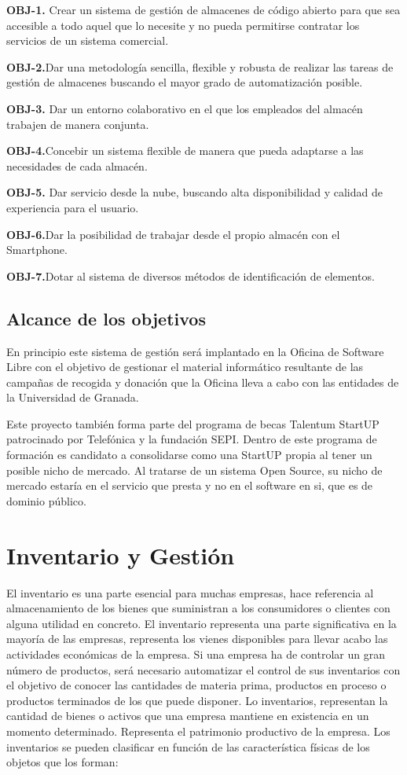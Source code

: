 \documentclass[a4paper,11pt]{book}
\begin{document}
\textbf{OBJ-1.} Crear un sistema de gestión de almacenes de código abierto para que sea accesible  a todo aquel que lo necesite y no pueda permitirse contratar los servicios de un sistema comercial. 

\textbf{OBJ-2.}Dar una metodología sencilla, flexible y robusta de realizar las tareas de gestión de almacenes buscando el mayor grado de automatización posible. 

\textbf{OBJ-3.} Dar un entorno colaborativo en el que los empleados del almacén trabajen de manera conjunta.

\textbf{OBJ-4.}Concebir un sistema flexible de manera que pueda adaptarse a las necesidades de cada almacén.

\textbf{OBJ-5.} Dar servicio desde la nube, buscando alta disponibilidad y calidad de experiencia para el usuario.  

\textbf{OBJ-6.}Dar la posibilidad de trabajar desde el propio almacén con el Smartphone. 

\textbf{OBJ-7.}Dotar al sistema de diversos métodos de identificación de elementos. 

\subsection{Alcance de los objetivos}

En principio este sistema de gestión será implantado en la Oficina de Software Libre con el objetivo de gestionar el material informático resultante de las campañas de recogida y donación que la Oficina lleva a cabo con las entidades de la Universidad de Granada. 

Este proyecto también forma parte del programa de becas Talentum StartUP patrocinado por Telefónica y la fundación SEPI. Dentro de este programa de formación es candidato a consolidarse como una StartUP propia al tener un posible nicho de mercado. Al tratarse de un sistema Open Source, su nicho de mercado estaría en el servicio que presta y no en el software en si, que es de dominio público. 

 

\section{Inventario y Gestión}
 
El inventario\cite{libro} es una parte esencial para muchas empresas, hace referencia al almacenamiento de los bienes que suministran a los consumidores o clientes con alguna utilidad en concreto. El inventario representa una parte significativa en la mayoría de las empresas, representa los vienes disponibles para llevar acabo las actividades económicas de la empresa.  Si una empresa ha de controlar un gran número de productos, será necesario automatizar el control de sus inventarios con el objetivo de conocer las cantidades de materia prima, productos en proceso o productos terminados de los que puede disponer.  Lo inventarios, representan la cantidad de bienes o activos que una empresa mantiene en existencia en un momento determinado. Representa el patrimonio productivo de la empresa. Los inventarios se pueden clasificar en función de las característica físicas de los objetos que los forman: 
\end{document}
